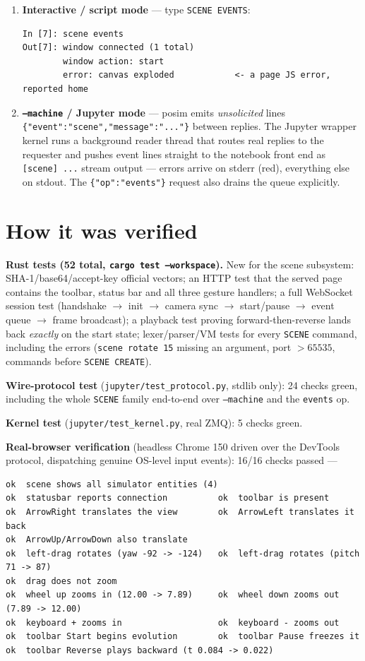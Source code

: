 \documentclass[11pt]{article}
\newcommand{\kw}[1]{\texttt{\uppercase{#1}}}
\newcommand{\code}[1]{\texttt{#1}}
\begin{document}
\begin{enumerate}
\item \textbf{Interactive / script mode} --- type \kw{scene events}:
\begin{lstlisting}
In [7]: scene events
Out[7]: window connected (1 total)
        window action: start
        error: canvas exploded            <- a page JS error, reported home
\end{lstlisting}
\item \textbf{\code{--machine} / Jupyter mode} --- posim emits
      \emph{unsolicited} lines
      \code{\{"event":"scene","message":"..."\}} between replies. The
      Jupyter wrapper kernel runs a background reader thread that
      routes real replies to the requester and pushes event lines
      straight to the notebook front end as \code{[scene] ...} stream
      output --- errors arrive on stderr (red), everything else on
      stdout. The \code{\{"op":"events"\}} request also drains the
      queue explicitly.
\end{enumerate}

\section{How it was verified}

\textbf{Rust tests (52 total, \code{cargo test --workspace}).} New
for the scene subsystem: SHA-1/base64/accept-key official vectors; an
HTTP test that the served page contains the toolbar, status bar and
all three gesture handlers; a full WebSocket session test (handshake
$\to$ init $\to$ camera sync $\to$ start/pause $\to$ event queue
$\to$ frame broadcast); a playback test proving
forward-then-reverse lands back \emph{exactly} on the start state;
lexer/parser/VM tests for every \kw{scene} command, including the
errors (\code{scene rotate 15} missing an argument, port $>65535$,
commands before \kw{scene create}).

\textbf{Wire-protocol test} (\code{jupyter/test\_protocol.py}, stdlib
only): 24 checks green, including the whole \kw{scene} family
end-to-end over \code{--machine} and the \code{events} op.

\textbf{Kernel test} (\code{jupyter/test\_kernel.py}, real ZMQ): 5
checks green.

\textbf{Real-browser verification} (headless Chrome 150 driven over
the DevTools protocol, dispatching genuine OS-level input events):
16/16 checks passed ---

\begin{lstlisting}
ok  scene shows all simulator entities (4)
ok  statusbar reports connection          ok  toolbar is present
ok  ArrowRight translates the view        ok  ArrowLeft translates it back
ok  ArrowUp/ArrowDown also translate
ok  left-drag rotates (yaw -92 -> -124)   ok  left-drag rotates (pitch 71 -> 87)
ok  drag does not zoom
ok  wheel up zooms in (12.00 -> 7.89)     ok  wheel down zooms out (7.89 -> 12.00)
ok  keyboard + zooms in                   ok  keyboard - zooms out
ok  toolbar Start begins evolution        ok  toolbar Pause freezes it
ok  toolbar Reverse plays backward (t 0.084 -> 0.022)
\end{lstlisting}
\end{document}
